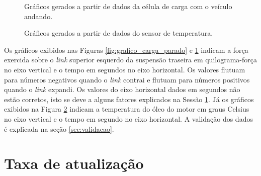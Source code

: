 \begin{figure}[!htb]
	\center
	\caption{Gráficos gerados a partir de dados da célula de carga com o veículo andando.}
	\qquad
	\qquad
	\qquad
	\label{fig:grafico_carga_andando}
\end{figure}


 \begin{figure}[!htb]
	\center
	\caption{Gráficos gerados a partir de dados do sensor de temperatura.}
	\qquad
	\label{fig:grafico_temperatura}
\end{figure}

Os gráficos exibidos nas Figuras \ref{fig:grafico_carga_parado} e \ref{fig:grafico_carga_andando} indicam a força exercida sobre o \textit{link} superior esquerdo da suspensão traseira em quilograma-força no eixo vertical e o tempo em segundos no eixo horizontal. Os valores flutuam para números negativos quando o \textit{link} contrai e flutuam para números positivos quando o \textit{link} expandi. Os valores do eixo horizontal dados em segundos não estão corretos, isto se deve a alguns fatores explicados na Sessão \ref{sec:taxa}. Já os gráficos exibidos na Figura \ref{fig:grafico_temperatura} indicam a temperatura do óleo do motor em graus Celsius no eixo vertical e o tempo em segundo no eixo horizontal. A validação dos dados é explicada na seção \ref{sec:validacao}. 

\section{Taxa de atualização}
\label{sec:taxa}

